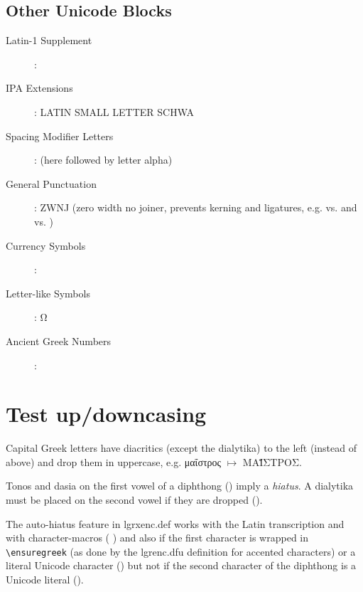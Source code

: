 \documentclass[a4paper]{article}
\begin{document}
\subsection{Other Unicode Blocks}

\begin{description}

\item [Latin-1 Supplement]: 
\item [IPA Extensions]:  LATIN SMALL LETTER SCHWA
\item [Spacing Modifier Letters]:
       (here followed by letter alpha)
\item [General Punctuation]:
       ZWNJ (zero width no joiner, prevents kerning
      and ligatures, e.g.  vs.  and
       vs. )
\item [Currency Symbols]: 
\item [Letter-like Symbols]: Ω  %
\item [Ancient Greek Numbers]: 
\end{description}

\newpage

\section{Test up/downcasing}

Capital Greek letters have diacritics (except the dialytika) to the left
(instead of above) and drop them in uppercase, e.g.
\foreignlanguage{greek}{μαΐστρος $\mapsto$ \MakeUppercase{μαΐστρος}}.

Tonos and dasia on the first vowel of a diphthong ()
imply a \emph{hiatus}. A dialytika must be placed on the second
vowel if they are dropped ().

The auto-hiatus feature in lgrxenc.def works with the Latin
transcription and with character-macros (%
)
and also if the first character is wrapped in \verb+\ensuregreek+ (as done by
the lgrenc.dfu definition for accented characters) or a literal Unicode
character
()
but not if the second character of the diphthong is a Unicode literal
().
\end{document}
